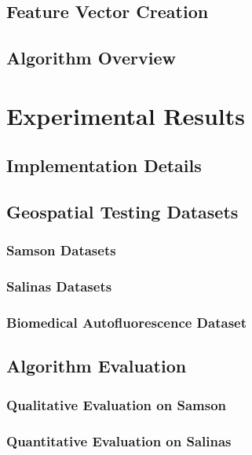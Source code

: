 \documentclass[10pt]{article}
\begin{document}
\subsection{Feature Vector Creation}\label{Algorithm FV}

\subsection{Algorithm Overview}\label{Algorithm Overview}


\clearpage
% 
% 
% 
% 
% 
\section{Experimental Results}


\subsection{Implementation Details}

\clearpage
\subsection{Geospatial Testing Datasets}
\subsubsection{Samson Datasets}
\subsubsection{Salinas Datasets}
\subsubsection{Biomedical Autofluorescence Dataset}

\clearpage
\subsection{Algorithm Evaluation}
\subsubsection{Qualitative Evaluation on Samson}
\subsubsection{Quantitative Evaluation on Salinas}
\end{document}
